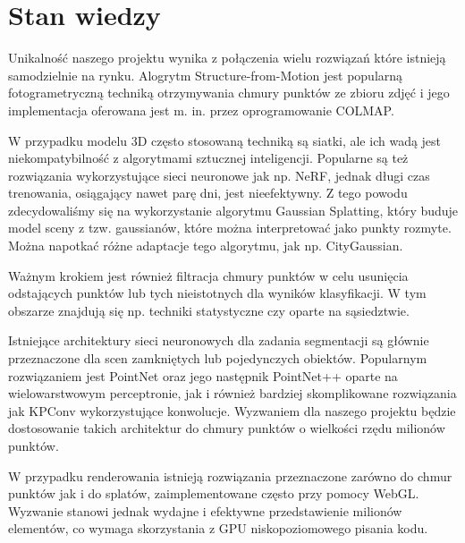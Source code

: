\section{Stan wiedzy}

Unikalność naszego projektu wynika z połączenia wielu rozwiązań które istnieją samodzielnie na rynku. Alogrytm Structure-from-Motion jest popularną fotogrametryczną techniką otrzymywania chmury punktów ze zbioru zdjęć i jego implementacja oferowana jest m. in. przez oprogramowanie COLMAP. 

W przypadku modelu 3D często stosowaną techniką są siatki, ale ich wadą jest niekompatybilność z algorytmami sztucznej inteligencji. Popularne są też rozwiązania wykorzystujące sieci neuronowe jak np. NeRF\cite{mildenhall2020nerfrepresentingscenesneural}, jednak długi czas trenowania, osiągający nawet parę dni, jest nieefektywny. Z tego powodu zdecydowaliśmy się na wykorzystanie algorytmu Gaussian Splatting\cite{kerbl3Dgaussians}, który buduje model sceny z tzw. gaussianów, które można interpretować jako punkty rozmyte. Można napotkać różne adaptacje tego algorytmu, jak np. CityGaussian\cite{liu2024citygaussian}.

Ważnym krokiem jest również filtracja chmury punktów w celu usunięcia odstających punktów lub tych nieistotnych dla wyników klasyfikacji. W tym obszarze znajdują się np. techniki statystyczne czy oparte na sąsiedztwie. 

Istniejące architektury sieci neuronowych dla zadania segmentacji są głównie przeznaczone dla scen zamkniętych lub pojedynczych obiektów. Popularnym rozwiązaniem jest PointNet\cite{qi2016pointnet} oraz jego następnik PointNet++\cite{qi2017pointnetdeephierarchicalfeature} oparte na wielowarstwowym perceptronie, jak i również bardziej skomplikowane rozwiązania jak KPConv\cite{thomas2019kpconvflexibledeformableconvolution} wykorzystujące konwolucje. Wyzwaniem dla naszego projektu będzie dostosowanie takich architektur do chmury punktów o wielkości rzędu milionów punktów.  

W przypadku renderowania istnieją rozwiązania przeznaczone zarówno do chmur punktów jak i do splatów, zaimplementowane często przy pomocy WebGL. Wyzwanie stanowi jednak wydajne i efektywne przedstawienie milionów elementów, co wymaga skorzystania z GPU niskopoziomowego pisania kodu. 

